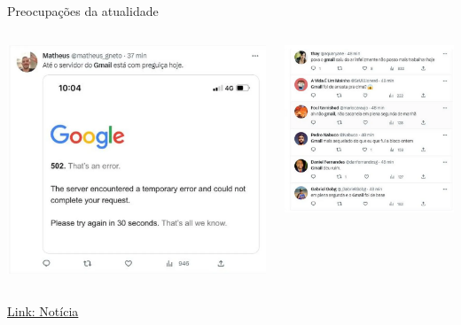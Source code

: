 \begin{frame}{Preocupações da atualidade}
\centering
\begin{columns}
    \begin{column}{0.48\linewidth}
        \includegraphics[width=\linewidth]{Figuras/gmail1.png}
    \end{column}
    \begin{column}{0.48\linewidth}
        \includegraphics[width=\linewidth]{Figuras/gmail2.png}
    \end{column}
\end{columns}
\href{https://g1.globo.com/tecnologia/noticia/2023/02/27/gmail-e-outros-servicos-do-google-apresentam-instabilidade-nesta-segunda.ghtml}{Link: Notícia}
\end{frame}


